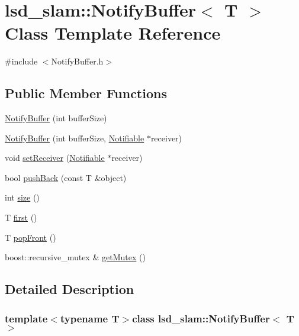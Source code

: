 \hypertarget{classlsd__slam_1_1_notify_buffer}{\section{lsd\-\_\-slam\-:\-:Notify\-Buffer$<$ T $>$ Class Template Reference}
\label{classlsd__slam_1_1_notify_buffer}
}


{\ttfamily \#include $<$Notify\-Buffer.\-h$>$}

\subsection*{Public Member Functions}
\begin{DoxyCompactItemize}
\item 
\hyperlink{classlsd__slam_1_1_notify_buffer_a38032ad4284b2e1f5e92812c52f162d6}{Notify\-Buffer} (int buffer\-Size)
\item 
\hyperlink{classlsd__slam_1_1_notify_buffer_a3933bbbf4b48593399950b251e677299}{Notify\-Buffer} (int buffer\-Size, \hyperlink{classlsd__slam_1_1_notifiable}{Notifiable} $\ast$receiver)
\item 
void \hyperlink{classlsd__slam_1_1_notify_buffer_abff5c7a6af7790acfc5cc2f83ae541c0}{set\-Receiver} (\hyperlink{classlsd__slam_1_1_notifiable}{Notifiable} $\ast$receiver)
\item 
bool \hyperlink{classlsd__slam_1_1_notify_buffer_a04532ca3a71447a2b8fa51f5e9db8dd8}{push\-Back} (const T \&object)
\item 
int \hyperlink{classlsd__slam_1_1_notify_buffer_ac077a4a4bb56f5dd9acd551c7c56a3a3}{size} ()
\item 
T \hyperlink{classlsd__slam_1_1_notify_buffer_a25b914af4aa669d39f8123364cfbb541}{first} ()
\item 
T \hyperlink{classlsd__slam_1_1_notify_buffer_ac16d9abdd418c98b87a8117a9b97eaf6}{pop\-Front} ()
\item 
boost\-::recursive\-\_\-mutex \& \hyperlink{classlsd__slam_1_1_notify_buffer_abd90fea9478812fb5b2a0333a2480f23}{get\-Mutex} ()
\end{DoxyCompactItemize}


\subsection{Detailed Description}
\subsubsection*{template$<$typename T$>$class lsd\-\_\-slam\-::\-Notify\-Buffer$<$ T $>$}

